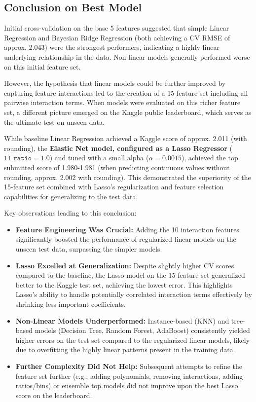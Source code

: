\documentclass[12pt,a4paper]{article}
\begin{document}
\subsection{Conclusion on Best Model}

Initial cross-validation on the base 5 features suggested that simple Linear Regression and Bayesian Ridge Regression (both achieving a CV RMSE of approx. 2.043) were the strongest performers, indicating a highly linear underlying relationship in the data. Non-linear models generally performed worse on this initial feature set.

However, the hypothesis that linear models could be further improved by capturing feature interactions led to the creation of a 15-feature set including all pairwise interaction terms. When models were evaluated on this richer feature set, a different picture emerged on the Kaggle public leaderboard, which serves as the ultimate test on unseen data.

While baseline Linear Regression achieved a Kaggle score of approx. 2.011 (with rounding), the \textbf{Elastic Net model, configured as a Lasso Regressor} ($\texttt{l1\_ratio}=1.0$) and tuned with a small alpha ($\alpha=0.0015$), achieved the top submitted score of 1.980-1.981 (when predicting continuous values without rounding, approx. 2.002 with rounding). This demonstrated the superiority of the 15-feature set combined with Lasso's regularization and feature selection capabilities for generalizing to the test data.

Key observations leading to this conclusion:
\begin{itemize}
    \item \textbf{Feature Engineering Was Crucial:} Adding the 10 interaction features significantly boosted the performance of regularized linear models on the unseen test data, surpassing the simpler models.
    \item \textbf{Lasso Excelled at Generalization:} Despite slightly higher CV scores compared to the baseline, the Lasso model on the 15-feature set generalized better to the Kaggle test set, achieving the lowest error. This highlights Lasso's ability to handle potentially correlated interaction terms effectively by shrinking less important coefficients.
    \item \textbf{Non-Linear Models Underperformed:} Instance-based (KNN) and tree-based models (Decision Tree, Random Forest, AdaBoost) consistently yielded higher errors on the test set compared to the regularized linear models, likely due to overfitting the highly linear patterns present in the training data.
    \item \textbf{Further Complexity Did Not Help:} Subsequent attempts to refine the feature set further (e.g., adding polynomials, removing interactions, adding ratios/bins) or ensemble top models did not improve upon the best Lasso score on the leaderboard.
\end{itemize}
\end{document}
